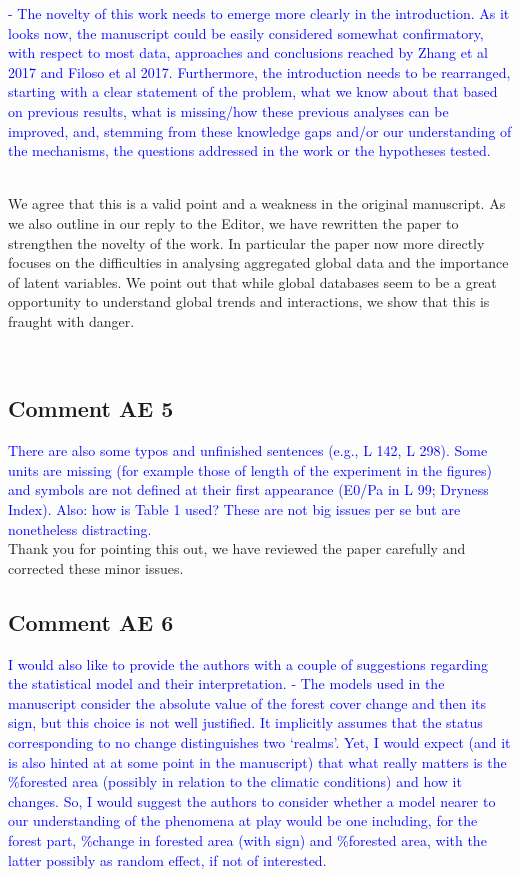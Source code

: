 \documentclass[]{elsarticle} %
\begin{document}
\textcolor{blue}{- The novelty of this work needs to emerge more clearly in the introduction. As it looks now, the manuscript could be easily considered somewhat confirmatory, with respect to most data, approaches and conclusions reached by Zhang et al 2017 and Filoso et al 2017. Furthermore, the introduction needs to be rearranged, starting with a clear statement of the problem, what we know about that based on previous results, what is missing/how these previous analyses can be improved, and, stemming from these knowledge gaps and/or our understanding of the mechanisms, the questions addressed in the work or the hypotheses tested.}\\
\strut \\
We agree that this is a valid point and a weakness in the original manuscript. As we also outline in our reply to the Editor, we have rewritten the paper to strengthen the novelty of the work. In particular the paper now more directly focuses on the difficulties in analysing aggregated global data and the importance of latent variables. We point out that while global databases seem to be a great opportunity to understand global trends and interactions, we show that this is fraught with danger.\\
\strut \\

\hypertarget{comment-ae-5}{%
\subsection{Comment AE 5}\label{comment-ae-5}}

\textcolor{blue}{There are also some typos and unfinished sentences (e.g., L 142, L 298). Some units are missing (for example those of length of the experiment in the figures) and symbols are not defined at their first appearance (E0/Pa in L 99; Dryness Index). Also: how is Table 1 used? These are not big issues per se but are nonetheless distracting.}\\
Thank you for pointing this out, we have reviewed the paper carefully and corrected these minor issues.

\hypertarget{comment-ae-6}{%
\subsection{Comment AE 6}\label{comment-ae-6}}

\textcolor{blue}{I would also like to provide the authors with a couple of suggestions regarding the statistical model and their interpretation. 
- The models used in the manuscript consider the absolute value of the forest cover change and then its sign, but this choice is not well justified. It implicitly assumes that the status corresponding to no change distinguishes two ‘realms’. Yet, I would expect (and it is also hinted at at some point in the manuscript) that what really matters is the \%forested area (possibly in relation to the climatic conditions) and how it changes. So, I would suggest the authors to consider whether a model nearer to our understanding of the phenomena at play would be one including, for the forest part, \%change in forested area (with sign) and \%forested area, with the latter possibly as random effect, if not of interested.}
\end{document}
